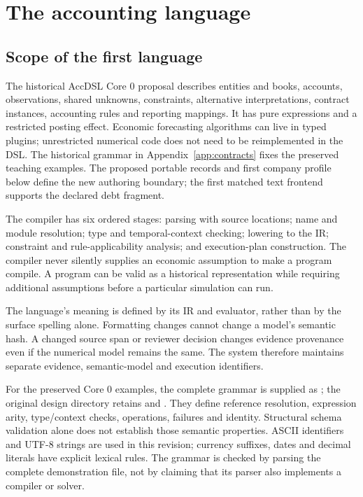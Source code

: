 \chapter{The accounting language}
\label{ch:language}

\section{Scope of the first language}

The historical AccDSL Core 0 proposal describes entities and books, accounts, observations, shared
unknowns, constraints, alternative interpretations, contract instances,
accounting rules and reporting mappings. It has pure expressions and a
restricted posting effect. Economic forecasting algorithms can live in typed
plugins; unrestricted numerical code does not need to be reimplemented in
the DSL. The historical grammar in Appendix~\ref{app:contracts} fixes the preserved
teaching examples. The proposed portable records and first company profile
below define the new authoring boundary; the first matched text frontend
supports the declared debt fragment.

The compiler has six ordered stages: parsing with source locations; name and
module resolution; type and temporal-context checking; lowering to the IR;
constraint and rule-applicability analysis; and execution-plan construction.
The compiler never silently supplies an economic assumption to make a program
compile. A program can be valid as a historical representation while requiring
additional assumptions before a particular simulation can run.

The language's meaning is defined by its IR and evaluator, rather than by the
surface spelling alone. Formatting changes cannot change a model's semantic
hash. A changed source span or reviewer decision changes evidence provenance
even if the numerical model remains the same. The system therefore maintains
separate evidence, semantic-model and execution identifiers.

For the preserved Core 0 examples, the complete grammar is supplied as
; the original design directory retains
 and . They define reference resolution, expression arity,
type/context checks, operations, failures and identity. Structural schema
validation alone does not establish those semantic properties. ASCII
identifiers and UTF-8 strings are used in this revision; currency suffixes,
dates and decimal literals have explicit lexical rules. The grammar is checked
by parsing the complete demonstration file, not by claiming that its parser
also implements a compiler or solver.

